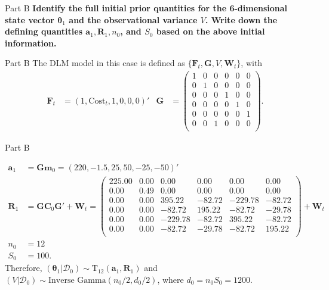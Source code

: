 \documentclass[14pt]{beamer}
\newcommand{\sD}{\mathcal{D}}
\newcommand{\bm}{\mathbf{m}}
\newcommand{\bC}{\mathbf{C}}
\newcommand{\btheta}{\boldsymbol{\theta}}
\newcommand{\bF}{\mathbf{F}}
\newcommand{\bG}{\mathbf{G}}
\newcommand{\bW}{\mathbf{W}}
\newcommand{\ba}{\mathbf{a}}
\newcommand{\bR}{\mathbf{R}}
\begin{document}
	\begin{frame}{Part B}
		\textbf{Identify the full initial prior quantities for the 6-dimensional state vector $\btheta_1$ and the observational variance $V$. Write down the defining quantities $\ba_1,\bR_1,n_0$, and $S_0$ based on the above initial information.}
	\end{frame}

	\begin{frame}{Part B}
		The DLM model in this case is defined as $\{ \bF_t, \bG,V,\bW_t \}$, with 
		\begin{align*}
		\bF_t & = (1,\text{Cost}_t,1,0,0,0)' &
		\bG & = \begin{pmatrix}
		1 & 0 & 0 & 0 & 0 & 0 \\
		0 & 1 & 0 & 0 & 0 & 0 \\
		0 & 0 & 0 & 1 & 0 & 0 \\
		0 & 0 & 0 & 0 & 1 & 0 \\
		0 & 0 & 0 & 0 & 0 & 1 \\
		0 & 0 & 1 & 0 & 0 & 0 \\
		\end{pmatrix}.
		\end{align*}
	\end{frame}

	\begin{frame}{Part B}
		
		{\scriptsize \begin{align*}
		\ba_1 & = \bG\bm_0 = (220,  -1.5,  25,  50, -25, -50)' \\
		\bR_1 & = \bG\bC_0\bG' + \bW_t = \begin{pmatrix}
		225.00 & 0.00 & 0.00 & 0.00 & 0.00 & 0.00 \\ 
		0.00 & 0.49 & 0.00 & 0.00 & 0.00 & 0.00 \\ 
		0.00 & 0.00 & 395.22 & -82.72 & -229.78 & -82.72 \\ 
		0.00 & 0.00 & -82.72 & 195.22 & -82.72 & -29.78 \\ 
		0.00 & 0.00 & -229.78 & -82.72 & 395.22 & -82.72 \\ 
		0.00 & 0.00 & -82.72 & -29.78 & -82.72 & 195.22 \\ 
		\end{pmatrix}  + \bW_t\\
		n_0 & = 12 \\
		S_0 & = 100.
		\end{align*}}
		Therefore, $(\btheta_1|\sD_0) \sim \text{T}_{12}(\ba_1,\bR_1)$ and $(V|\sD_0) \sim \text{Inverse Gamma}(n_0/2,d_0/2)$, where $d_0 = n_0S_0 = 1200$.
	\end{frame}
\end{document}

